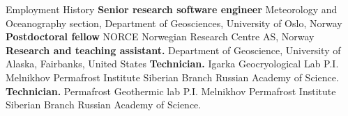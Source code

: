 \begin{rubric}{Employment History}
\entry*[2023 -- present] \textbf{Senior research software engineer} Meteorology and Oceanography section, Department of Geosciences, University of Oslo, Norway
%
\entry*[2021 -- 2023] \textbf{Postdoctoral fellow} NORCE Norwegian Research Centre AS, Norway
%
\entry*[2014 -- 2020]%
	\textbf{Research and teaching assistant.} Department of Geoscience, University of Alaska, Fairbanks, United States
%
\entry*[2011 -- 2013]%
	\textbf{Technician.} Igarka Geocryological Lab P.I. Melnikhov Permafrost Institute Siberian Branch
Russian Academy of Science.
    \entry*[2011]%
	\textbf{Technician.} Permafrost Geothermic lab P.I. Melnikhov Permafrost Institute Siberian Branch Russian
Academy of Science.
%
\end{rubric}